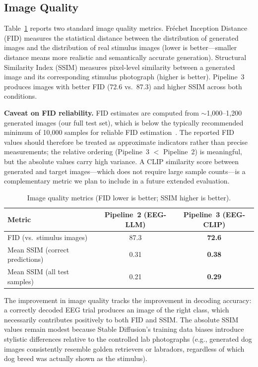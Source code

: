 \documentclass{article}
\begin{document}
\subsection{Image Quality}

Table~\ref{tab:image_quality} reports two standard image quality metrics. Fr\'echet Inception Distance (FID) measures the statistical distance between the distribution of generated images and the distribution of real stimulus images (lower is better---smaller distance means more realistic and semantically accurate generation). Structural Similarity Index (SSIM) measures pixel-level similarity between a generated image and its corresponding stimulus photograph (higher is better). Pipeline~3 produces images with better FID (72.6 vs.\ 87.3) and higher SSIM across both conditions.

\textbf{Caveat on FID reliability.} FID estimates are computed from $\sim$1,000--1,200 generated images (our full test set), which is below the typically recommended minimum of 10,000 samples for reliable FID estimation~\citep{binkowski2018demystifying}. The reported FID values should therefore be treated as approximate indicators rather than precise measurements; the relative ordering (Pipeline~3 $<$ Pipeline~2) is meaningful, but the absolute values carry high variance. A CLIP similarity score between generated and target images---which does not require large sample counts---is a complementary metric we plan to include in a future extended evaluation.

\begin{table}[h]
  \centering
  \caption{Image quality metrics (FID lower is better; SSIM higher is better).}
  \label{tab:image_quality}
  \begin{tabular}{lcc}
    \toprule
    \textbf{Metric} & \textbf{Pipeline~2 (EEG-LLM)} & \textbf{Pipeline~3 (EEG-CLIP)} \\
    \midrule
    FID (vs.\ stimulus images)        & 87.3  & \textbf{72.6} \\
    Mean SSIM (correct predictions)   & 0.31  & \textbf{0.38} \\
    Mean SSIM (all test samples)      & 0.21  & \textbf{0.29} \\
    \bottomrule
  \end{tabular}
\end{table}

The improvement in image quality tracks the improvement in decoding accuracy: a correctly decoded EEG trial produces an image of the right class, which necessarily contributes positively to both FID and SSIM. The absolute SSIM values remain modest because Stable Diffusion's training data biases introduce stylistic differences relative to the controlled lab photographs (e.g., generated dog images consistently resemble golden retrievers or labradors, regardless of which dog breed was actually shown as the stimulus).
\end{document}
